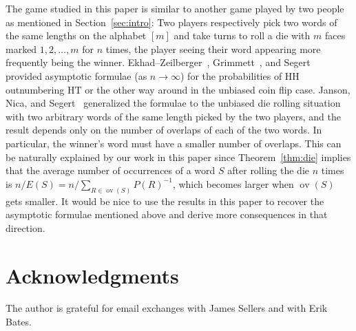 \documentclass[10pt]{amsart}
\theoremstyle{definition}
\theoremstyle{remark}
\newcommand{\HH}{\mathrm{H}} \newcommand{\TT}{\mathrm{T}}
\DeclareMathOperator{\overlap}{ov}
\begin{document}



The game studied in this paper is similar to another game played by two people as mentioned in Section~\ref{sec:intro}: 
Two players respectively pick two words of the same lengths on the alphabet $[m]$ and take turns to roll a die with $m$ faces marked $1,2,\ldots,m$ for $n$ times, the player seeing their word appearing more frequently being the winner.
Ekhad--Zeilberger~\cite{EkhadZeilberger}, Grimmett~\cite{Grimmett}, and Segert~\cite{Segert} provided asymptotic formulae (as $n\to\infty$) for the probabilities of $\HH\HH$ outnumbering $\HH\TT$ or the other way around in the unbiased coin flip case.
Janson, Nica, and Segert~\cite{JNS} generalized the formulae to the unbiased die rolling situation with two arbitrary words of the same length picked by the two players, and the result depends only on the number of overlaps of each of the two words.
In particular, the winner's word must have a smaller number of overlaps.
This can be naturally explained by our work in this paper since Theorem~\ref{thm:die} implies that the average number of occurrences of a word $S$ after rolling the die $n$ times is $n/E(S) = n \big/ \sum_{R\in\overlap(S)} P(R)^{-1}$, which becomes larger when $\overlap(S)$ gets smaller.
It would be nice to use the results in this paper to recover the asymptotic formulae mentioned above and derive more consequences in that direction.

\section*{Acknowledgments}

The author is grateful for email exchanges with James Sellers and with Erik Bates.
\end{document}
